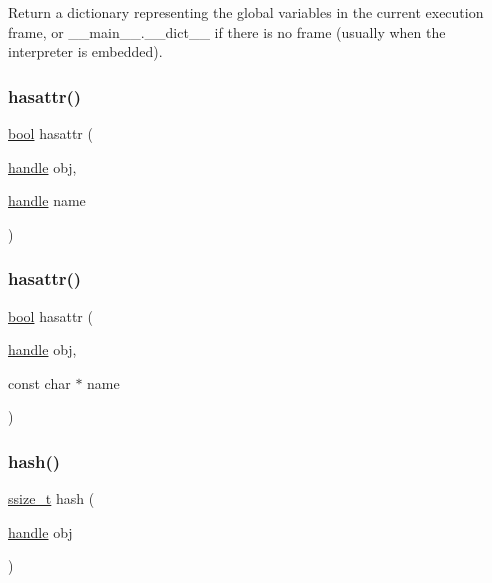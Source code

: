 Return a dictionary representing the global variables in the current execution frame, or {\ttfamily \+\_\+\+\_\+main\+\_\+\+\_\+.\+\_\+\+\_\+dict\+\_\+\+\_\+} if there is no frame (usually when the interpreter is embedded). \mbox{\label{group__python__builtins_gacc0a69f008d341c07ff939e0580c5985}} 
\subsubsection{\texorpdfstring{hasattr()}{hasattr()}\hspace{0.1cm}{\footnotesize\ttfamily [1/2]}}
{\footnotesize\ttfamily \mbox{\hyperlink{asdl_8h_af6a258d8f3ee5206d682d799316314b1}{bool}} hasattr (\begin{DoxyParamCaption}\item[{\mbox{\hyperlink{classhandle}{handle}}}]{obj,  }\item[{\mbox{\hyperlink{classhandle}{handle}}}]{name }\end{DoxyParamCaption})\hspace{0.3cm}{\ttfamily [inline]}}

\mbox{\label{group__python__builtins_gaec38f84a4416ddc3b311ecdbff659ed7}} 
\subsubsection{\texorpdfstring{hasattr()}{hasattr()}\hspace{0.1cm}{\footnotesize\ttfamily [2/2]}}
{\footnotesize\ttfamily \mbox{\hyperlink{asdl_8h_af6a258d8f3ee5206d682d799316314b1}{bool}} hasattr (\begin{DoxyParamCaption}\item[{\mbox{\hyperlink{classhandle}{handle}}}]{obj,  }\item[{const char $\ast$}]{name }\end{DoxyParamCaption})\hspace{0.3cm}{\ttfamily [inline]}}

\mbox{\label{group__python__builtins_ga117a7eab72791313448c40a2f25f3582}} 
\subsubsection{\texorpdfstring{hash()}{hash()}}
{\footnotesize\ttfamily \mbox{\hyperlink{detail_2common_8h_ac430d16fc097b3bf0a7469cfd09decda}{ssize\+\_\+t}} hash (\begin{DoxyParamCaption}\item[{\mbox{\hyperlink{classhandle}{handle}}}]{obj }\end{DoxyParamCaption})\hspace{0.3cm}{\ttfamily [inline]}}

